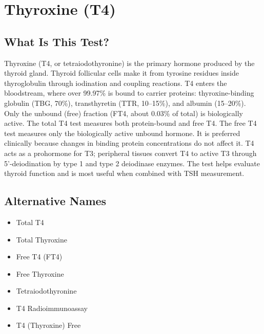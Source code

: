 \chapter{Thyroxine (T4)}

\section*{What Is This Test?}
Thyroxine (T4, or tetraiodothyronine) is the primary hormone produced by the thyroid gland. Thyroid follicular cells make it from tyrosine residues inside thyroglobulin through iodination and coupling reactions. T4 enters the bloodstream, where over 99.97\% is bound to carrier proteins: thyroxine-binding globulin (TBG, 70\%), transthyretin (TTR, 10--15\%), and albumin (15--20\%). Only the unbound (free) fraction (FT4, about 0.03\% of total) is biologically active. The total T4 test measures both protein-bound and free T4. The free T4 test measures only the biologically active unbound hormone. It is preferred clinically because changes in binding protein concentrations do not affect it. T4 acts as a prohormone for T3; peripheral tissues convert T4 to active T3 through 5'-deiodination by type 1 and type 2 deiodinase enzymes. The test helps evaluate thyroid function and is most useful when combined with TSH measurement.

\section*{Alternative Names}
\begin{itemize}
  \item Total T4
  \item Total Thyroxine
  \item Free T4 (FT4)
  \item Free Thyroxine
  \item Tetraiodothyronine
  \item T4 Radioimmunoassay
  \item T4 (Thyroxine) Free
\end{itemize}
